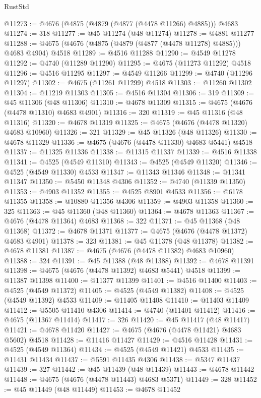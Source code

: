 \begin{lexlean}{RustStd}
\begin{coremodule}
{\begin{coremodule}
{{{{{{{{{{{{{{{{{{{{{{{{{{{{{{{{{{{{{{{{{{{{{{{{{{{{{{{{{{{{@11273 := @4676 (@4875 (@4879 (@4877 (@4478 @11266) @4885))) @4683
@11274 := 318
@11277 := @45 @11274 (@48 @11274)
@11278 := @4881 @11277
@11288 := @4675 (@4676 (@4875 (@4879 (@4877 (@4478 @11278) @4885))) @4683 @4904) @4518
@11289 := @4516 @11288
@11290 := @4549 @11278
@11292 := @4740 (@11289 @11290)
@11295 := @4675 (@11273 @11292) @4518
@11296 := @4516 @11295
@11297 := @4549 @11266
@11299 := @4740 (@11296 @11297)
@11302 := @4675 (@11261 @11299) @4518
@11303 := @11260 @11302
@11304 := @11219 @11303
@11305 := @4516 @11304
@11306 := 319
@11309 := @45 @11306 (@48 @11306)
@11310 := @4678 @11309
@11315 := @4675 (@4676 (@4478 @11310) @4683 @4901)
@11316 := 320
@11319 := @45 @11316 (@48 @11316)
@11320 := @4678 @11319
@11325 := @4675 (@4676 (@4478 @11320) @4683 @10960)
@11326 := 321
@11329 := @45 @11326 (@48 @11326)
@11330 := @4678 @11329
@11336 := @4675 (@4676 (@4478 @11330) @4683 @5441) @4518
@11337 := @11325 @11336
@11338 := @11315 @11337
@11339 := @4516 @11338
@11341 := @4525 (@4549 @11310)
@11343 := @4525 (@4549 @11320)
@11346 := @4525 (@4549 @11330) @4533
@11347 := @11343 @11346
@11348 := @11341 @11347
@11350 := @5450 @11348 @4306
@11352 := @4740 (@11339 @11350)
@11353 := @4903 @11352
@11355 := @4525 @8901 @4533
@11356 := @6178 @11355
@11358 := @10880 @11356 @4306
@11359 := @4903 @11358
@11360 := 325
@11363 := @45 @11360 (@48 @11360)
@11364 := @4678 @11363
@11367 := @4676 (@4478 @11364) @4683
@11368 := 322
@11371 := @45 @11368 (@48 @11368)
@11372 := @4678 @11371
@11377 := @4675 (@4676 (@4478 @11372) @4683 @4901)
@11378 := 323
@11381 := @45 @11378 (@48 @11378)
@11382 := @4678 @11381
@11387 := @4675 (@4676 (@4478 @11382) @4683 @10960)
@11388 := 324
@11391 := @45 @11388 (@48 @11388)
@11392 := @4678 @11391
@11398 := @4675 (@4676 (@4478 @11392) @4683 @5441) @4518
@11399 := @11387 @11398
@11400 := @11377 @11399
@11401 := @4516 @11400
@11403 := @4525 (@4549 @11372)
@11405 := @4525 (@4549 @11382)
@11408 := @4525 (@4549 @11392) @4533
@11409 := @11405 @11408
@11410 := @11403 @11409
@11412 := @5505 @11410 @4306
@11414 := @4740 (@11401 @11412)
@11416 := @4675 (@11367 @11414)
@11417 := 326
@11420 := @45 @11417 (@48 @11417)
@11421 := @4678 @11420
@11427 := @4675 (@4676 (@4478 @11421) @4683 @5602) @4518
@11428 := @11416 @11427
@11429 := @4516 @11428
@11431 := @4525 (@4549 @11364)
@11434 := @4525 (@4549 @11421) @4533
@11435 := @11431 @11434
@11437 := @5591 @11435 @4306
@11438 := @5347 @11437
@11439 := 327
@11442 := @45 @11439 (@48 @11439)
@11443 := @4678 @11442
@11448 := @4675 (@4676 (@4478 @11443) @4683 @5371)
@11449 := 328
@11452 := @45 @11449 (@48 @11449)
@11453 := @4678 @11452
}}}}}}}}}}}}}}}}}}}}}}}}}}}}}}}}}}}}}}}}}}}}}}}}}}}}}}}}}}}}
\end{coremodule}}
\end{coremodule}
\end{lexlean}
